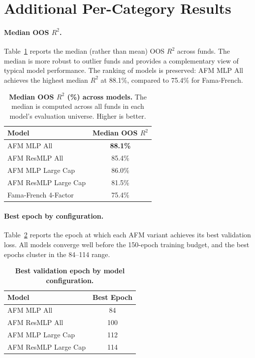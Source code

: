 \section{Additional Per-Category Results}\label{app:additional_results}

\paragraph{Median OOS $R^2$.}
Table~\ref{tab:median_r2} reports the median (rather than mean) OOS $R^2$ across funds. The median is more robust to outlier funds and provides a complementary view of typical model performance. The ranking of models is preserved: AFM MLP All achieves the highest median $R^2$ at 88.1\%, compared to 75.4\% for Fama-French.

\begin{table}[h]
\centering
\caption{\textbf{Median OOS $R^2$ (\%) across models.} The median is computed across all funds in each model's evaluation universe. Higher is better.}
\label{tab:median_r2}
\begin{tabular}{lc}
\toprule
\textbf{Model} & \textbf{Median OOS $R^2$} \\
\midrule
AFM MLP All & \textbf{88.1\%} \\
AFM ResMLP All & 85.4\% \\
AFM MLP Large Cap & 86.0\% \\
AFM ResMLP Large Cap & 81.5\% \\
Fama-French 4-Factor & 75.4\% \\
\bottomrule
\end{tabular}
\end{table}

\paragraph{Best epoch by configuration.}
Table~\ref{tab:best_epoch} reports the epoch at which each AFM variant achieves its best validation loss. All models converge well before the 150-epoch training budget, and the best epochs cluster in the 84--114 range.

\begin{table}[h]
\centering
\caption{\textbf{Best validation epoch by model configuration.}}
\label{tab:best_epoch}
\begin{tabular}{lc}
\toprule
\textbf{Model} & \textbf{Best Epoch} \\
\midrule
AFM MLP All & 84 \\
AFM ResMLP All & 100 \\
AFM MLP Large Cap & 112 \\
AFM ResMLP Large Cap & 114 \\
\bottomrule
\end{tabular}
\end{table}

